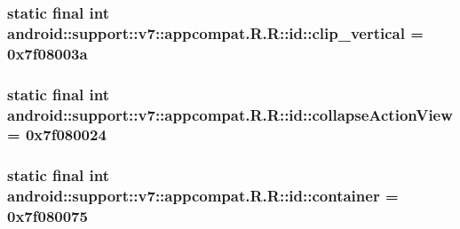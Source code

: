 \hypertarget{classandroid_1_1support_1_1v7_1_1appcompat_1_1_r_1_1id_5ef6bc19c0516d2b7313e286311849fc}{
\subsubsection[{clip\_\-vertical}]{\setlength{\rightskip}{0pt plus 5cm}static final int android::support::v7::appcompat.R.R::id::clip\_\-vertical = 0x7f08003a}}
\label{classandroid_1_1support_1_1v7_1_1appcompat_1_1_r_1_1id_5ef6bc19c0516d2b7313e286311849fc}


\hypertarget{classandroid_1_1support_1_1v7_1_1appcompat_1_1_r_1_1id_93bec2cafee93d6e137f499b53decb09}{
\subsubsection[{collapseActionView}]{\setlength{\rightskip}{0pt plus 5cm}static final int android::support::v7::appcompat.R.R::id::collapseActionView = 0x7f080024}}
\label{classandroid_1_1support_1_1v7_1_1appcompat_1_1_r_1_1id_93bec2cafee93d6e137f499b53decb09}


\hypertarget{classandroid_1_1support_1_1v7_1_1appcompat_1_1_r_1_1id_72c87b3109c50ec415e3d0cc76002a69}{
\subsubsection[{container}]{\setlength{\rightskip}{0pt plus 5cm}static final int android::support::v7::appcompat.R.R::id::container = 0x7f080075}}
\label{classandroid_1_1support_1_1v7_1_1appcompat_1_1_r_1_1id_72c87b3109c50ec415e3d0cc76002a69}


